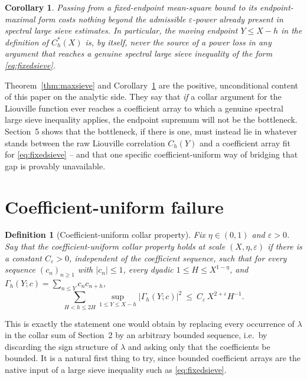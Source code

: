 \documentclass[11pt]{article}
\newtheorem{corollary}[theorem]{Corollary}
\newtheorem{definition}[theorem]{Definition}
\begin{document}
\begin{corollary}
\label{cor:free}
Passing from a fixed-endpoint mean-square bound to its endpoint-maximal form costs nothing beyond the
admissible $\varepsilon$-power already present in spectral large sieve estimates. In particular, the
moving endpoint $Y\le X-h$ in the definition of $C_h^\ast(X)$ is, by itself, never the source of a power
loss in any argument that reaches a genuine spectral large sieve inequality of the form
\eqref{eq:fixedsieve}.
\end{corollary}

Theorem~\ref{thm:maxsieve} and Corollary~\ref{cor:free} are the positive, unconditional content of this
paper on the analytic side. They say that \emph{if} a collar argument for the Liouville function ever
reaches a coefficient array to which a genuine spectral large sieve inequality applies, the endpoint
supremum will not be the bottleneck. Section~5 shows that the bottleneck, if there is one, must instead lie in
whatever stands between the raw Liouville correlation $C_h(Y)$ and a coefficient array fit for
\eqref{eq:fixedsieve} -- and that one specific coefficient-uniform way of bridging that gap is provably
unavailable.

\section{Coefficient-uniform failure}

\begin{definition}[Coefficient-uniform collar property]
Fix $\eta\in(0,1)$ and $\varepsilon>0$. Say that the \emph{coefficient-uniform collar property} holds at
scale $(X,\eta,\varepsilon)$ if there is a constant $C_\varepsilon>0$, independent of the coefficient
sequence, such that for \emph{every} sequence $(c_n)_{n\ge1}$ with $|c_n|\le1$, every dyadic
$1\le H\le X^{1-\eta}$, and $\Gamma_h(Y;c)=\sum_{n\le Y}c_nc_{n+h}$,
\[
\sum_{H<h\le2H}\sup_{1\le Y\le X-h}|\Gamma_h(Y;c)|^2\ \le\ C_\varepsilon\,X^{2+\varepsilon}H^{-1}.
\]
\end{definition}

This is exactly the statement one would obtain by replacing every occurrence of $\lambda$ in the collar
sum of Section~2 by an arbitrary bounded sequence, i.e.\ by discarding the sign structure of $\lambda$ and
asking only that the coefficients be bounded. It is a natural first thing to try, since bounded coefficient
arrays are the native input of a large sieve inequality such as \eqref{eq:fixedsieve}.
\end{document}
